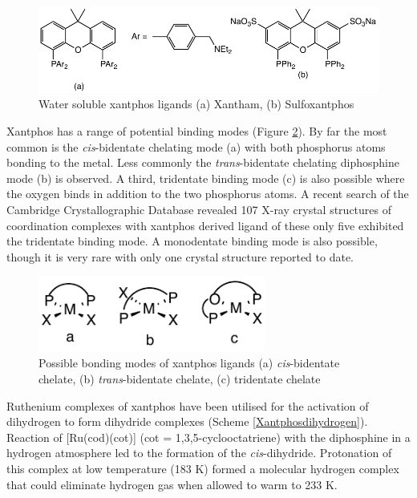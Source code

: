 \begin{figure}[ht]
\centering
\includegraphics[]{../Figures/Xantham.pdf}
\caption[Water soluble xantphos ligands]{Water soluble xantphos ligands (a) Xantham, (b) Sulfoxantphos}
\label{Xantham}
\end{figure}

Xantphos has a range of potential binding modes (Figure \ref{Xantphosbinding}).  By far the most common is the \emph{cis}-bidentate chelating mode (a) with both phosphorus atoms bonding to the metal.  Less commonly the \emph{trans}-bidentate chelating diphosphine mode (b) is observed.  A third, tridentate binding mode (c) is also possible where the oxygen binds in addition to the two phosphorus atoms.  A recent search of the Cambridge Crystallographic Database revealed 107 X-ray crystal structures of coordination complexes with xantphos derived ligand of these only five exhibited the tridentate binding mode.  A monodentate binding mode is also possible, though it is very rare with only one crystal structure reported to date.\cite{Escalle2009}

\begin{figure}[ht]
\centering
\includegraphics[height = 2.5cm]{../Figures/Xantphosbinding.pdf}
\caption[Possible bonding modes of xantphos ligands]{Possible bonding modes of xantphos ligands (a) \emph{cis}-bidentate chelate, (b) \emph{trans}-bidentate chelate, (c) tridentate chelate}
\label{Xantphosbinding}
\end{figure}

Ruthenium complexes of xantphos have been utilised for the activation of dihydrogen to form dihydride complexes (Scheme \ref{Xantphosdihydrogen}).\cite{Lenero2003}  Reaction of [Ru(cod)(cot)] (\gls{cot} = 1,3,5-cyclooctatriene) with the diphosphine in a hydrogen atmosphere led to the formation of the \emph{cis}-dihydride.  Protonation of this complex at low temperature (183 K) formed a molecular hydrogen complex that could eliminate hydrogen gas when allowed to warm to 233 K.  

